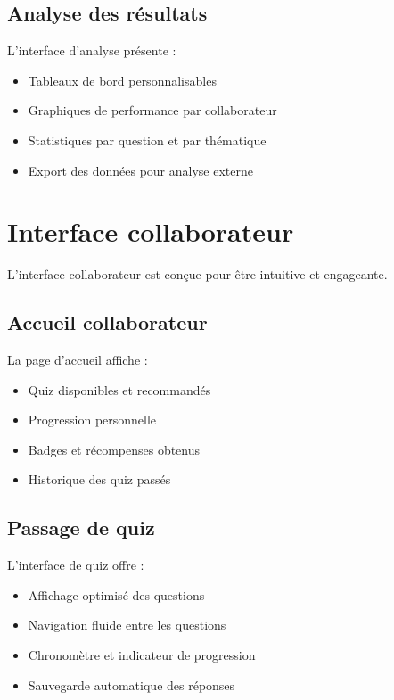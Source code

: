 \documentclass[12pt,a4paper]{report}
\begin{document}
\subsection{Analyse des résultats}

L'interface d'analyse présente :

\begin{itemize}
    \item Tableaux de bord personnalisables
    \item Graphiques de performance par collaborateur
    \item Statistiques par question et par thématique
    \item Export des données pour analyse externe
\end{itemize}

\section{Interface collaborateur}

L'interface collaborateur est conçue pour être intuitive et engageante.

\subsection{Accueil collaborateur}

La page d'accueil affiche :

\begin{itemize}
    \item Quiz disponibles et recommandés
    \item Progression personnelle
    \item Badges et récompenses obtenus
    \item Historique des quiz passés
\end{itemize}

\subsection{Passage de quiz}

L'interface de quiz offre :

\begin{itemize}
    \item Affichage optimisé des questions
    \item Navigation fluide entre les questions
    \item Chronomètre et indicateur de progression
    \item Sauvegarde automatique des réponses
\end{itemize}
\end{document}
